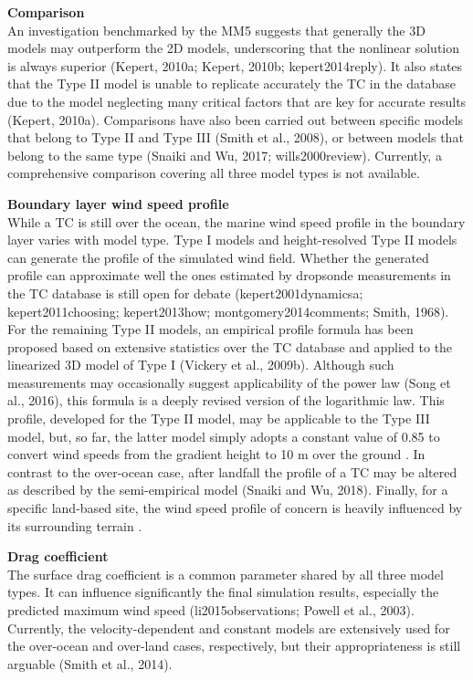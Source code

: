 \noindent\textbf{Comparison } \\An investigation benchmarked by the MM5 \citep{liu1997multiscale} suggests that generally the 3D models may outperform the 2D models, underscoring that the nonlinear solution is always superior (Kepert, 2010a; Kepert, 2010b; kepert2014reply). It also states that the Type II model is unable to replicate accurately the TC in the database due to the model neglecting many critical factors that are key for accurate results (Kepert, 2010a). Comparisons have also been carried out between specific models that belong to Type II and Type III (Smith et al., 2008), or between models that belong to the same type (Snaiki and Wu, 2017; wills2000review). Currently, a comprehensive comparison covering all three model types is not available. 
\newline

\noindent\textbf{Boundary layer wind speed profile} \\While a TC is still over the ocean, the marine wind speed profile in the boundary layer varies with model type. Type I models and height-resolved Type II models can generate the profile of the simulated wind field. Whether the generated profile can approximate well the ones estimated by dropsonde measurements in the TC database is still open for debate (kepert2001dynamicsa; kepert2011choosing; kepert2013how; montgomery2014comments; Smith, 1968). For the remaining Type II models, an empirical profile formula has been proposed based on extensive statistics over the TC database and applied to the linearized 3D model of Type I (Vickery et al., 2009b). Although such measurements may occasionally suggest applicability of the power law (Song et al., 2016), this formula is a deeply revised version of the logarithmic law. This profile, developed for the Type II model, may be applicable to the Type III model, but, so far, the latter model simply adopts a constant value of 0.85 to convert wind speeds from the gradient height to 10 m over the ground \citep{chavas2015model}. In contrast to the over-ocean case, after landfall the profile of a TC may be altered as described by the semi-empirical model (Snaiki and Wu, 2018). Finally, for a specific land-based site, the wind speed profile of concern is heavily influenced by its surrounding terrain \citep{huang2013prediction}.
\newline

\noindent\textbf{Drag coefficient} \\The surface drag coefficient is a common parameter shared by all three model types. It can influence significantly the final simulation results, especially the predicted maximum wind speed (li2015observations; Powell et al., 2003). Currently, the velocity-dependent and constant models are extensively used for the over-ocean and over-land cases, respectively, but their appropriateness is still arguable (Smith et al., 2014). 
\newline


